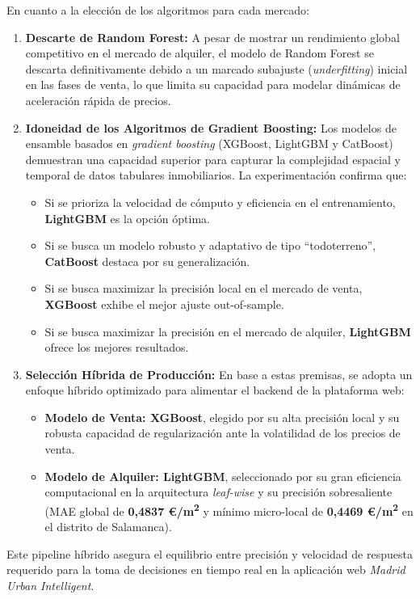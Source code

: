 \documentclass[a4paper,11pt,openany]{book}
\begin{document}
En cuanto a la elección de los algoritmos para cada mercado:
\begin{enumerate}
    \item \textbf{Descarte de Random Forest:} A pesar de mostrar un rendimiento global competitivo en el mercado de alquiler, el modelo de Random Forest se descarta definitivamente debido a un marcado subajuste (\textit{underfitting}) inicial en las fases de venta, lo que limita su capacidad para modelar dinámicas de aceleración rápida de precios.
    \item \textbf{Idoneidad de los Algoritmos de Gradient Boosting:} Los modelos de ensamble basados en \textit{gradient boosting} (XGBoost, LightGBM y CatBoost) demuestran una capacidad superior para capturar la complejidad espacial y temporal de datos tabulares inmobiliarios. La experimentación confirma que:
    \begin{itemize}
        \item Si se prioriza la velocidad de cómputo y eficiencia en el entrenamiento, \textbf{LightGBM} es la opción óptima.
        \item Si se busca un modelo robusto y adaptativo de tipo ``todoterreno'', \textbf{CatBoost} destaca por su generalización.
        \item Si se busca maximizar la precisión local en el mercado de venta, \textbf{XGBoost} exhibe el mejor ajuste out-of-sample.
        \item Si se busca maximizar la precisión en el mercado de alquiler, \textbf{LightGBM} ofrece los mejores resultados.
    \end{itemize}
    \item \textbf{Selección Híbrida de Producción:} En base a estas premisas, se adopta un enfoque híbrido optimizado para alimentar el backend de la plataforma web:
    \begin{itemize}
        \item \textbf{Modelo de Venta: XGBoost}, elegido por su alta precisión local y su robusta capacidad de regularización ante la volatilidad de los precios de venta.
        \item \textbf{Modelo de Alquiler: LightGBM}, seleccionado por su gran eficiencia computacional en la arquitectura \textit{leaf-wise} y su precisión sobresaliente (MAE global de \textbf{0,4837 €/m\textsuperscript{2}} y mínimo micro-local de \textbf{0,4469 €/m\textsuperscript{2}} en el distrito de Salamanca).
    \end{itemize}
\end{enumerate}
Este pipeline híbrido asegura el equilibrio entre precisión y velocidad de respuesta requerido para la toma de decisiones en tiempo real en la aplicación web \textit{Madrid Urban Intelligent}.
\end{document}
